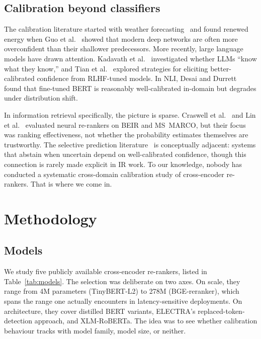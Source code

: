 \subsection{Calibration beyond classifiers}
The calibration literature started with weather forecasting~\cite{brier1950} and
found renewed energy when Guo et al.~\cite{guo2017} showed that modern deep
networks are often more overconfident than their shallower predecessors. More
recently, large language models have drawn attention. Kadavath et
al.~\cite{kadavath2022} investigated whether LLMs ``know what they know,'' and Tian
et al.~\cite{tian2023} explored strategies for eliciting better-calibrated
confidence from RLHF-tuned models. In NLI, Desai and Durrett~\cite{desai2020} found
that fine-tuned BERT is reasonably well-calibrated in-domain but degrades under
distribution shift.

In information retrieval specifically, the picture is sparse. Craswell et
al.~\cite{craswell2020} and Lin et al.~\cite{lin2021pyserini} evaluated neural
re-rankers on BEIR and MS~MARCO, but their focus was ranking effectiveness, not
whether the probability estimates themselves are trustworthy. The selective prediction
literature~\cite{geifman2017,el2010} is conceptually adjacent: systems that abstain
when uncertain depend on well-calibrated confidence, though this connection is rarely
made explicit in IR work. To our knowledge, nobody has conducted a systematic
cross-domain calibration study of cross-encoder re-rankers. That is where we come in.

\section{Methodology}
\label{sec:method}

\subsection{Models}
\label{sec:models}
We study five publicly available cross-encoder re-rankers, listed in
Table~\ref{tab:models}. The selection was deliberate on two axes. On scale, they
range from 4M parameters (TinyBERT-L2) to 278M (BGE-reranker), which spans the
range one actually encounters in latency-sensitive deployments. On architecture, they
cover distilled BERT variants, ELECTRA's replaced-token-detection approach, and
XLM-RoBERTa. The idea was to see whether calibration behaviour tracks with model
family, model size, or neither.

